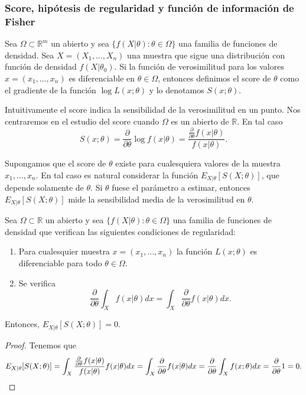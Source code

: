 \documentclass{article}
\begin{document}
    \subsubsection{Score, hipótesis de regularidad y función de información de Fisher}

    \begin{definition}
        Sea $\Omega \subset \mathbb{R}^m$ un abierto y sea $\{f(X|\theta): \theta \in \Omega\}$ una familia de funciones de densidad. Sea $X = (X_1, \ldots, X_n)$ una muestra que sigue una distribución con función de densidad $f(X|\theta_0)$. Si la función de verosimilitud para los valores $x = (x_1, \ldots, x_n)$ es diferenciable en $\theta \in \Omega$, entonces definimos el score de $\theta$ como el gradiente de la función $\log L(x; \theta)$ y lo denotamos $S(x; \theta)$.
    \end{definition}

    Intuitivamente el score indica la sensibilidad de la verosimilitud en un punto. Nos centraremos en el estudio del score cuando $\Omega$ es un abierto de $\mathbb{R}$. En tal caso
    \[S(x; \theta) = \frac{\partial}{\partial \theta} \log f(x | \theta) = \frac{\frac{\partial}{\partial \theta} f(x | \theta)}{f(x | \theta)}.\]

    Supongamos que el score de $\theta$ existe para cualesquiera valores de la muestra $x_1, \ldots, x_n$. En tal caso es natural considerar la función $E_{X|\theta}[S(X;\theta)]$, que depende solamente de $\theta$. Si $\theta$ fuese el parámetro a estimar, entonces $E_{X|\theta}[S(X;\theta)]$ mide la sensibilidad media de la verosimilitud en $\theta$.

    \begin{lem} \label{lem:score:esp}
        Sea $\Omega \subset \mathbb{R}$ un abierto y sea $\{f(X|\theta): \theta \in \Omega\}$ una familia de funciones de densidad que verifican las siguientes condiciones de regularidad:
        \begin{enumerate}
            \item Para cualesquier muestra $x=(x_1, \ldots, x_n)$ la función $L(x; \theta)$ es diferenciable para todo $\theta \in \Omega$.
            \item Se verifica
            \[\frac{\partial}{\partial \theta}\int_{X} f(x| \theta) dx = \int_{X} \frac{\partial}{\partial \theta} f(x| \theta) dx.\]
        \end{enumerate}
        Entonces, $E_{X|\theta}[S(X;\theta)] = 0$.
    \end{lem}
    \begin{proof}
        Tenemos que
        \[E_{X|\theta}[S(X;\theta)] = \int_{X} \frac{\frac{\partial}{\partial \theta} f(x | \theta)}{f(x | \theta)}  f(x | \theta) dx = \int_{X} \frac{\partial}{\partial \theta} f(x | \theta) dx = \frac{\partial}{\partial \theta} \int_{X} f(x; \theta) dx = \frac{\partial}{\partial \theta} 1 = 0. \qedhere\]
    \end{proof}
\end{document}
